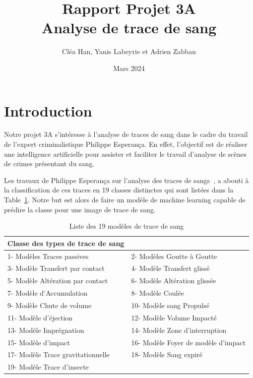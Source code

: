 \documentclass[a4paper]{article}
\title{Rapport Projet 3A \\ Analyse de trace de sang}
\author{Cléa Han, Yanis Labeyrie et Adrien Zabban}
\date{Mars 2024}
\begin{document}
\maketitle

\section{Introduction}

Notre projet 3A s'intéresse à l'analyse de traces de sang dans le cadre du travail de l'expert criminalistique Philippe Esperança. En effet, l'objectif est de réaliser une intelligence artificielle pour assister et faciliter le travail d'analyse de scènes de crimes présentant du sang. 

Les travaux de Philippe Esperança sur l'analyse des traces de sangs~\cite{PhilippeEsperança}, a abouti à la classification de ces traces en 19 classes distinctes qui sont listées dans la Table~\ref{tab:classes}. Notre but est alors de faire un modèle de machine learning capable de prédire la classe pour une image de trace de sang.

\begin{table}[ht]
    \centering
    \begin{tabular}{|ll|}
        \hline
        \textbf{Classe des types de trace de sang} &  \\
        \hline
        1- Modèles Traces passives & 2- Modèles Goutte à Goutte \\
        3- Modèle Transfert par contact & 4- Modèle Transfert glissé \\
        5- Modèle Altération par contact & 6- Modèle Altération glissée \\
        7- Modèle d'Accumulation & 8- Modèle Coulée \\
        9- Modèle Chute de volume & 10- Modèle sang Propulsé \\
        11- Modèle d'éjection & 12- Modèle Volume Impacté \\
        13- Modèle Imprégnation & 14- Modèle Zone d'interruption \\
        15- Modèle d'impact & 16- Modèle Foyer de modèle d'impact \\
        17- Modèle Trace gravitationnelle & 18- Modèle Sang expiré \\
        19- Modèle Trace d'insecte & \\
        \hline
    \end{tabular}
    \caption{Liste des 19 modèles de trace de sang}
    \label{tab:classes}
\end{table}
\end{document}
